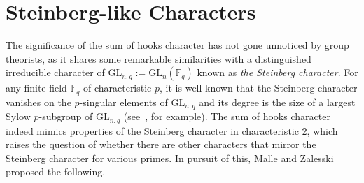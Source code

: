 \documentclass[12pt]{article}
\begin{document}
\section{Steinberg-like Characters}\label{sec:stlike}

The significance of the sum of hooks character has not gone unnoticed by group theorists, as it shares some remarkable similarities with a distinguished irreducible character of $\mathrm{GL}_{n,q} := \mathrm{GL}_n(\mathbb{F}_q)$ known as \emph{the Steinberg character}. For any finite field $\mathbb{F}_q$ of characteristic $p$, it is well-known that the Steinberg character vanishes on the $p$-singular elements of $\mathrm{GL}_{n,q}$ and its degree is the size of a largest Sylow $p$-subgroup of $\mathrm{GL}_{n,q}$ (see~\cite{Humphreys87}, for example). The sum of hooks character indeed mimics properties of the Steinberg character in characteristic 2, which raises the question of whether there are other characters that mirror the Steinberg character for various primes. In pursuit of this, Malle and Zalesski~\cite{MalleZ20} proposed the following.
\end{document}
